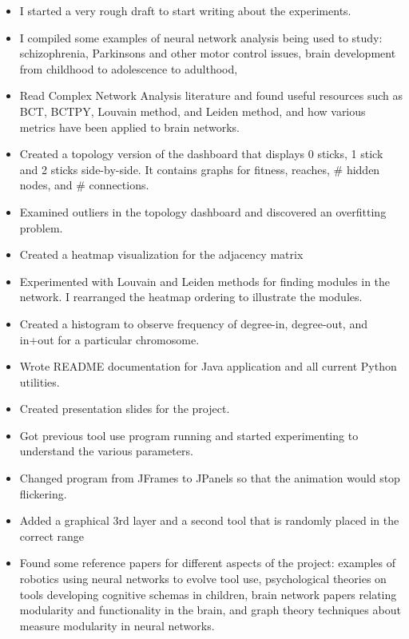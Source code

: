 \documentclass{article}
\begin{document}
\begin{itemize}
\begin{itemize}
        \item Do more complex tasks result in a more modular structure overall? \textbf{Difficult to answer because CPM isn't the same as modularity, it changes based on things like network size and density, so it's not really fair to compare across the networks as a measure of modularity.}
    \end{itemize}
    \item I started a very rough draft to start writing about the experiments.
    \item I compiled some examples of neural network analysis being used to study: schizophrenia, Parkinsons and other motor control issues, brain development from childhood to adolescence to adulthood, 
    \item Read Complex Network Analysis literature and found useful resources such as BCT, BCTPY, Louvain method, and Leiden method, and how various metrics have been applied to brain networks.
    \item Created a topology version of the dashboard that displays 0 sticks, 1 stick and 2 sticks side-by-side. It contains graphs for fitness, reaches, \# hidden nodes, and \# connections. 
    \item Examined outliers in the topology dashboard and discovered an overfitting problem.
    \item Created a heatmap visualization for the adjacency matrix
    \item Experimented with Louvain and Leiden methods for finding modules in the network. I rearranged the heatmap ordering to illustrate the modules.
    \item Created a histogram to observe frequency of degree-in, degree-out, and in+out for a particular chromosome.
    \item Wrote README documentation for Java application and all current Python utilities.
    \item Created presentation slides for the project.
    \item Got previous tool use program running and started experimenting to understand the various parameters. 
    \item Changed program from JFrames to JPanels so that the animation would stop flickering.
    \item Added a graphical 3rd layer and a second tool that is randomly placed in the correct range
    \item Found some reference papers for different aspects of the project: examples of robotics using neural networks to evolve tool use, psychological theories on tools developing cognitive schemas in children, brain network papers relating modularity and functionality in the brain, and graph theory techniques about measure modularity in neural networks.

\end{itemize}
\end{document}
